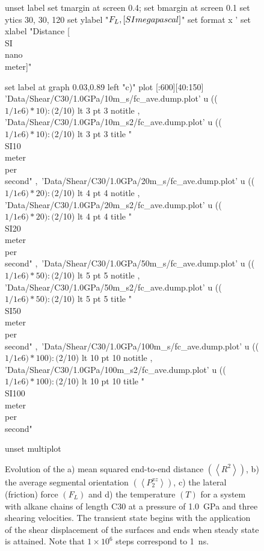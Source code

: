 \documentclass[aps,prb,reprint,superscriptaddress, a4paper]{revtex4-1}
\begin{document}
\begin{figure}
\begin{center}
\begin{gnuplot}[terminal=pdf, terminaloptions={size \SERFigwidth cm, \SERFigheight cm color solid}]
			unset label
			set tmargin at screen 0.4; set bmargin at screen 0.1
			set ytics 30, 30, 120 
			set ylabel "$F_L \\, [\\SI{}{\\mega\\pascal}]$" 
			set format x '%
			set xlabel "Distance [\\SI{}{\\nano\\meter}]"  

			set label at graph 0.03,0.89 left "c)"
			plot  [:600][40:150]	'Data/Shear/C30/1.0GPa/10m_s/fc_ave.dump.plot' u (($1/1e6)*10):($2/10)  lt 3 pt 3 notitle  ,                           'Data/Shear/C30/1.0GPa/10m_s2/fc_ave.dump.plot' u (($1/1e6)*10):($2/10)   lt 3 pt 3 title  "\\SI{10}{\\meter\\per\\second}"   ,\
							'Data/Shear/C30/1.0GPa/20m_s/fc_ave.dump.plot' u (($1/1e6)*20):($2/10)  lt 4 pt 4 notitle  , 'Data/Shear/C30/1.0GPa/20m_s2/fc_ave.dump.plot' u (($1/1e6)*20):($2/10)   lt 4 pt 4 title  "\\SI{20}{\\meter\\per\\second}"   ,\
							'Data/Shear/C30/1.0GPa/50m_s/fc_ave.dump.plot' u (($1/1e6)*50):($2/10)   lt 5 pt 5 notitle  , 'Data/Shear/C30/1.0GPa/50m_s2/fc_ave.dump.plot'  u (($1/1e6)*50):($2/10)  lt 5 pt 5 title  "\\SI{50}{\\meter\\per\\second}"  ,\
							'Data/Shear/C30/1.0GPa/100m_s/fc_ave.dump.plot' u (($1/1e6)*100):($2/10) lt 10 pt 10 notitle  , 'Data/Shear/C30/1.0GPa/100m_s2/fc_ave.dump.plot'  u (($1/1e6)*100):($2/10) lt 10 pt 10 title  "\\SI{100}{\\meter\\per\\second}"  

			unset multiplot
		\end{gnuplot}

		\caption{Evolution of the a) mean squared end-to-end distance $\left(\left< R^2 \right>\right)$, b) the average segmental orientation  $\left(\left<P_{2}^{xz}\right>\right)$, c) the lateral (friction) force  $\left(F_L\right)$ and d) the temperature $\left(T\right)$ for a system with alkane chains of length C30 at a pressure of \SI{1.0}{\giga\pascal} and  three  shearing velocities. The transient state begins with the application of the shear displacement of the surfaces and ends when  steady state is attained. Note that $1 \times 10^{6}$ steps correspond to \SI{1}{\nano\second}.}
		\label{fig:SS}
	\end{center}
 \end{figure}
\end{document}

